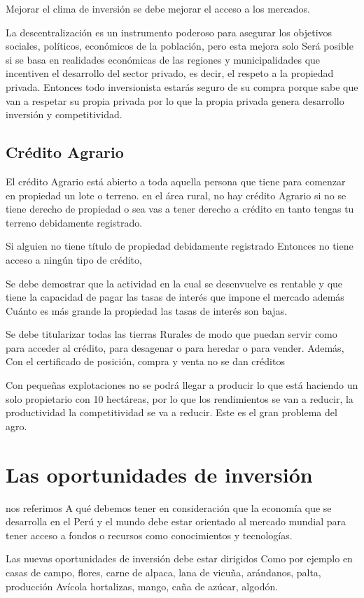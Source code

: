\documentclass[
  a4paper,
]{article}
\begin{document}
Mejorar el clima de inversión se debe mejorar el acceso a los mercados.

La descentralización es un instrumento poderoso para asegurar los
objetivos sociales, políticos, económicos de la población, pero esta
mejora solo Será posible si se basa en realidades económicas de las
regiones y municipalidades que incentiven el desarrollo del sector
privado, es decir, el respeto a la propiedad privada. Entonces todo
inversionista estarás seguro de su compra porque sabe que van a respetar
su propia privada por lo que la propia privada genera desarrollo
inversión y competitividad.

\hypertarget{cruxe9dito-agrario}{%
\subsection{Crédito Agrario}\label{cruxe9dito-agrario}}

El crédito Agrario está abierto a toda aquella persona que tiene para
comenzar en propiedad un lote o terreno. en el área rural, no hay
crédito Agrario si no se tiene derecho de propiedad o sea vas a tener
derecho a crédito en tanto tengas tu terreno debidamente registrado.

Si alguien no tiene título de propiedad debidamente registrado Entonces
no tiene acceso a ningún tipo de crédito,

Se debe demostrar que la actividad en la cual se desenvuelve es rentable
y que tiene la capacidad de pagar las tasas de interés que impone el
mercado además Cuánto es más grande la propiedad las tasas de interés
son bajas.

Se debe titularizar todas las tierras Rurales de modo que puedan servir
como para acceder al crédito, para desagenar o para heredar o para
vender. Además, Con el certificado de posición, compra y venta no se dan
créditos

Con pequeñas explotaciones no se podrá llegar a producir lo que está
haciendo un solo propietario con 10 hectáreas, por lo que los
rendimientos se van a reducir, la productividad la competitividad se va
a reducir. Este es el gran problema del agro.

\hypertarget{las-oportunidades-de-inversiuxf3n}{%
\section{Las oportunidades de
inversión}\label{las-oportunidades-de-inversiuxf3n}}

nos referimos A qué debemos tener en consideración que la economía que
se desarrolla en el Perú y el mundo debe estar orientado al mercado
mundial para tener acceso a fondos o recursos como conocimientos y
tecnologías.

Las nuevas oportunidades de inversión debe estar dirigidos Como por
ejemplo en casas de campo, flores, carne de alpaca, lana de vicuña,
arándanos, palta, producción Avícola hortalizas, mango, caña de azúcar,
algodón.


\printbibliography
\end{document}
